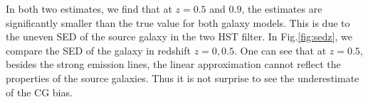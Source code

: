\documentclass[useAMS,usenatbib]{mn2e}
\begin{document}
In both two estimates, we find that at $z=0.5$ and $0.9$, the estimates are
significantly smaller than the true value for both galaxy models. This is
due to the uneven SED of the source galaxy in the two HST filter. In
Fig.\ref{fig:sedz}, we compare the SED of the galaxy in redshift
$z=0,0.5$. One can see that at $z=0.5$, besides the strong emission
lines, the linear approximation cannot reflect the properties of the
source galaxies. Thus it is not surprise to see the underestimate of the
CG bias.
\end{document}
